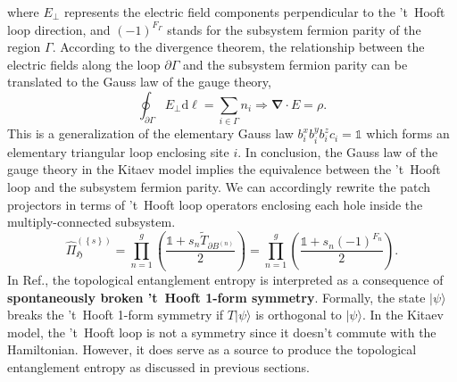 \documentclass[12font]{article}
\theoremstyle{definition}
\newcommand{\ket}[1]{| #1 \rangle}
\newcommand{\dive}{\boldsymbol{\nabla}\cdot}
\newcommand{\lr}[1]{\left(  #1  \right)}
\newcommand{\lrg}[1]{\left\{  #1  \right\}}
\newcommand{\de}{\partial}
\newcommand{\mrm}[1]{\mathrm{#1}}
\begin{document}
where $E_\perp$ represents the electric field components perpendicular to the 't~Hooft loop direction, and $(-1)^{F_\Gamma}$ stands for the subsystem fermion parity of the region $\Gamma$. According to the divergence theorem, the relationship between the electric fields along the loop $\de\Gamma$ and the subsystem fermion parity can be translated to the Gauss law of the gauge theory,
\[
\oint_{\de\Gamma} E_\perp \mrm{d}\ell = \sum_{i\in\Gamma} n_i \Rightarrow \dive E = \rho.
\]
This is a generalization of the elementary Gauss law $b^x_ib^y_ib^z_ic_i = \mathds{1}$ which forms an elementary triangular loop enclosing site $i$. In conclusion, the Gauss law of the gauge theory in the Kitaev model implies the equivalence between the 't~Hooft loop and the subsystem fermion parity. We can accordingly rewrite the patch projectors in terms of 't~Hooft loop operators enclosing each hole inside the multiply-connected subsystem.
\begin{equation}\label{eq:thooft-loop-projector}
    \hat{\Pi}_\mathfrak{H}^{(\lrg{s})} 
    = 
    \prod_{n=1}^{g}\lr{\frac{\mathds{1} + s_n \tilde{T}_{\de B^{(n)}}}{2}}
    =
    \prod_{n=1}^{g}\lr{\frac{\mathds{1} + s_n (-1)^{F_n}}{2}}
    .
\end{equation}
In Ref.\cite{Xu-Rakovszky-Knap-Pollmann_2025}, the topological entanglement entropy is interpreted as a consequence of \textbf{spontaneously broken 't~Hooft 1-form symmetry}. Formally, the state $\ket{\psi}$ breaks the 't~Hooft 1-form symmetry if $T\ket{\psi}$ is orthogonal to $\ket{\psi}$. In the Kitaev model, the 't~Hooft loop is not a symmetry since it doesn't commute with the Hamiltonian. However, it does serve as a source to produce the topological entanglement entropy as discussed in previous sections. 
\end{document}
